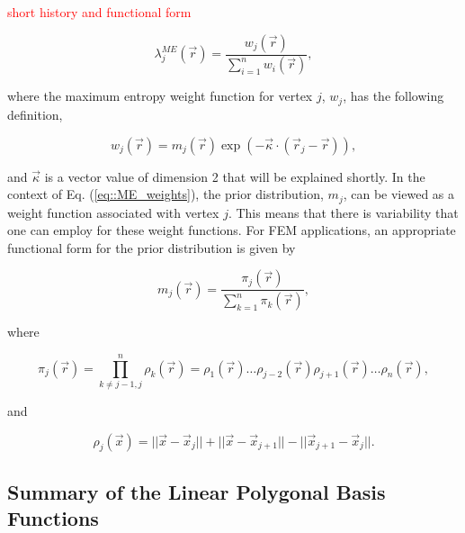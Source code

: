 \documentclass[preprint,10pt]{elsarticle}
\newcommand{\tcr}[1]{\textcolor{red}{#1}}
\begin{document}
\tcr{short history and functional form}

\begin{equation}
\label{eq::ME_BF}
\lambda_{j}^{ME} (\vec{r}) = \frac{w_j (\vec{r}) }{\sum\limits_{i=1}^{n} w_i (\vec{r})} ,
\end{equation}

\noindent where the maximum entropy weight function for vertex $j$, $w_j$, has the following definition,

\begin{equation}
\label{eq::ME_weights}
w_j (\vec{r})  = m_j(\vec{r}) \exp(-  \vec{\kappa} \cdot (\vec{r}_j - \vec{r})),
\end{equation}

\noindent and $\vec{\kappa}$ is a vector value of dimension 2 that will be explained shortly. In the context of Eq. (\ref{eq::ME_weights}), the prior distribution, $m_j$, can be viewed as a weight function associated with vertex $j$. This means that there is variability that one can employ for these weight functions. For FEM applications, an appropriate functional form for the prior distribution is given by

\begin{equation}
\label{eq::ME_prior_funcs}
 m_j(\vec{r}) = \frac{\pi_j (\vec{r}) }{\sum\limits_{k=1}^{n} \pi_k (\vec{r})},
\end{equation}

\noindent where

\begin{equation}
\label{eq::ME_prior_products}
\pi_j (\vec{r}) = \prod\limits_{k \neq j-1, j}^{n} \rho_k (\vec{r})  = \rho_1(\vec{r}) \ldots \rho_{j-2}(\vec{r}) \rho_{j+1}(\vec{r}) \ldots \rho_{n}(\vec{r}) ,
\end{equation}

\noindent and

\begin{equation}
\label{eq::ME_face_funcs}
\rho_j (\vec{x}) = || \vec{x} - \vec{x}_j || + || \vec{x} - \vec{x}_{j+1} || - || \vec{x}_{j+1} - \vec{x}_j || .
\end{equation}

\subsection{Summary of the Linear Polygonal Basis Functions}
\end{document}
